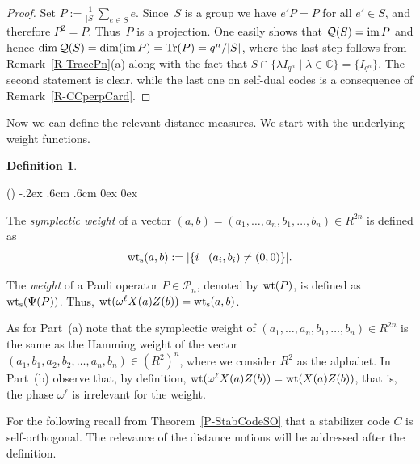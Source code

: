 \documentclass[11pt]{article}
\theoremstyle{definition}
\newtheorem{defi}[theo]{Definition}
\numberwithin{equation}{section}
\newcommand{\C}{{\mathbb C}}
\newcommand{\cP}{{\mathcal P}}
\newcommand{\cQ}{{\mathcal Q}}
\newcommand{\im}{\mbox{\rm im}\,}
\newcommand{\Tr}{\mbox{\rm Tr}}
\newcommand{\wt}{{\rm wt}}
\newcommand{\wts}{\mbox{${\rm wt}_{\rm s}$}}
\newcounter{alp}
\newcounter{rom}
\newenvironment{alphalist}{\begin{list}{(\alph{alp})\hfill}{\usecounter{alp}
     \topsep-.2ex \labelwidth.6cm \leftmargin.6cm \labelsep0cm
     \rightmargin0cm \parsep0ex \itemsep0ex}}{\end{list}}
\begin{document}
\begin{proof}
Set $P:=\frac{1}{|S|}\sum_{e\in S}e$.
Since~$S$ is a group we have $e'P=P$ for all $e'\in S$, and therefore $P^2=P$.
Thus~$P$ is a projection.
One easily shows that $\cQ(S)=\im P$ and hence
$\dim\cQ(S)=\dim(\im P)=\Tr(P)=q^n/|S|$, where the last step follows from
Remark~\ref{R-TracePn}(a) along with the fact that $S\cap\{\lambda I_{q^n}\mid \lambda\in \C\}=\{I_{q^n}\}$.
The second statement is clear, while the last one on self-dual codes
is a consequence of Remark~\ref{R-CCperpCard}.
\end{proof}

Now we can define the relevant distance measures.
We start with the underlying weight functions.

\begin{defi}\label{D-Weight}
\begin{alphalist}
\item The \emph{symplectic weight} of a vector $(a,b)=(a_1,\ldots,a_n,b_1,\ldots,b_n)\in R^{2n}$ is defined as
       \[
          \wts(a,b):=|\{i\mid (a_i,b_i)\neq(0,0)\}|.
       \]
\item The \emph{weight} of a Pauli operator $P\in\cP_n$, denoted by $\wt(P)$, is defined as $\wts(\Psi(P))$.
      Thus, $\wt(\omega^\ell X(a)Z(b))=\wts(a,b)$.
\end{alphalist}
\end{defi}

As for Part~(a) note that the symplectic weight of $(a_1,\ldots,a_n,b_1,\ldots,b_n)\in R^{2n}$ is the same as the Hamming weight of the vector
$(a_1,b_1,a_2,b_2,\ldots,a_n,b_n)\in (R^2)^n$, where we consider $R^2$ as the alphabet.
In Part~(b) observe that,  by definition, $\wt(\omega^\ell X(a)Z(b))= \wt(X(a)Z(b))$, that is, the phase $\omega^\ell$ is irrelevant for the weight.

For the following recall from Theorem~\ref{P-StabCodeSO} that a stabilizer code $C$ is self-orthogonal.
The relevance of the distance notions will be addressed after the definition.
\end{document}
